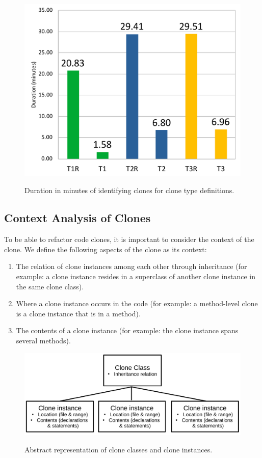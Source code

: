\documentclass[a4paper]{article}
\begin{document}
\begin{figure}[H]
  \caption{Duration in minutes of identifying clones for clone type definitions.}
    \includegraphics[width=.96\columnwidth]{img/DurationChart}
  \label{fig:performance}
\end{figure}

\subsection{Context Analysis of Clones}\label{chap:clonecontextexpl}
To be able to refactor code clones, it is important to consider the context of the clone. We define the following aspects of the clone as its context:
\begin{enumerate}
  \item The relation of clone instances among each other through inheritance (for example: a clone instance resides in a superclass of another clone instance in the same clone class).
  \item Where a clone instance occurs in the code (for example: a method-level clone is a clone instance that is in a method).
  \item The contents of a clone instance (for example: the clone instance spans several methods).
\end{enumerate}

\begin{figure}[H]
  \caption{Abstract representation of clone classes and clone instances.}
    \medskip
    \includegraphics[width=1\columnwidth]{img/context}
  \label{fig:clonecontext}
\end{figure}
\end{document}
